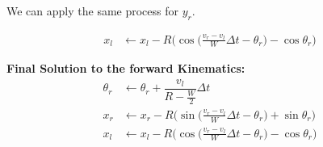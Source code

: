 \documentclass{article}
\begin{document}
We can apply the same process for $y_r$.

\begin{align}
  x_l &\leftarrow x_l-R\Bigg(\cos{\Big(\frac{v_r-v_l}{W}\Delta t-\theta_r\Big)}-\cos{\theta_r}\Bigg)
\end{align}

\textbf{Final Solution to the forward Kinematics:}
\begin{align}
 \theta_r &\leftarrow \theta_r + \dfrac{v_l}{R-\frac{W}{2}}\Delta t \\
  x_r &\leftarrow x_r-R\Bigg(\sin{\Big(\frac{v_r-v_l}{W}\Delta t-\theta_r\Big)}+\sin{\theta_r}\Bigg) \\
  x_l &\leftarrow x_l-R\Bigg(\cos{\Big(\frac{v_r-v_l}{W}\Delta t-\theta_r\Big)}-\cos{\theta_r}\Bigg)
\end{align}
\end{document}
